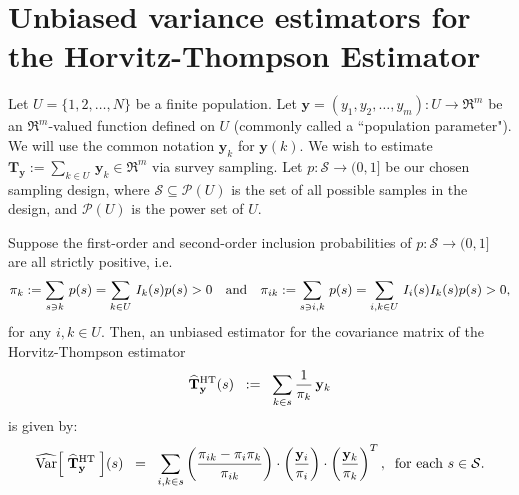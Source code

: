 \documentclass{article}
\begin{document}

\section{Unbiased variance estimators for the Horvitz-Thompson Estimator}
\setcounter{theorem}{0}

Let $U = \{1,2,\ldots,N\}$ be a finite population.
Let $\mathbf{y} = (y_{1},y_{2},\ldots,y_{m}) : U \longrightarrow \Re^{m}$ be an $\Re^{m}$-valued function defined on $U$
(commonly called a ``population parameter").
We will use the common notation $\mathbf{y}_{k}$ for $\mathbf{y}(k)$.
We wish to estimate
$\mathbf{T}_{\mathbf{y}} := \underset{k \in U}{\sum}\,\mathbf{y}_{k} \in \Re^{m}$
via survey sampling.
Let $p:\mathcal{S} \longrightarrow (0,1]$ be our chosen sampling design,
where $\mathcal{S} \subseteq \mathcal{P}(U)$ is the set of all possible
samples in the design, and $\mathcal{P}(U)$ is the power set of $U$.

\begin{proposition}
\mbox{}
\vskip 0.1cm
\noindent
Suppose the first-order and second-order inclusion probabilities of $p:\mathcal{S}\longrightarrow(0,1]$
are all strictly positive, i.e.
\begin{equation*}
\pi_{k} := \sum_{s \ni k}\,p(s) = \sum_{k \in U}\,I_{k}(s)p(s) > 0
\quad\textnormal{and}\quad
\pi_{ik} := \sum_{s \ni i,k}\,p(s) = \sum_{i,k \in U}\,I_{i}(s)I_{k}(s)p(s) > 0,
\end{equation*}
for any $i,k \in U$.
Then, an unbiased estimator for the covariance matrix of the Horvitz-Thompson estimator
\begin{equation*}
\widehat{\mathbf{T}}^{\textnormal{HT}}_{\mathbf{y}}(s)
\;\;:=\;\;
\sum_{k \in s} \dfrac{1}{\pi_{k}}\,\mathbf{y}_{k}
\end{equation*}
is given by:
\begin{equation*}
\widehat{\textnormal{Var}}\!\left[\;\widehat{\mathbf{T}}^{\textnormal{HT}}_{\mathbf{y}}\;\right]\!(s)
\;\;=\;\;
\sum_{i,k \in s}\left(\dfrac{\pi_{ik} - \pi_{i}\pi_{k}}{\pi_{ik}}\right)\cdot\left(\dfrac{\mathbf{y}_{i}}{\pi_{i}}\right)\cdot\left(\dfrac{\mathbf{y}_{k}}{\pi_{k}}\right)^{T},
\;\;\textnormal{for each $s \in \mathcal{S}$}.
\end{equation*}
\end{proposition}
\end{document}
